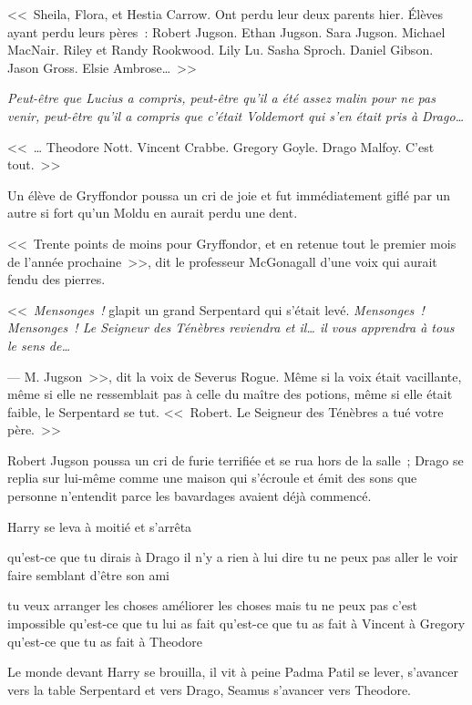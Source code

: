 <<~Sheila, Flora, et Hestia Carrow. Ont perdu leur deux parents hier. Élèves ayant perdu leurs pères~: Robert Jugson. Ethan Jugson. Sara Jugson. Michael MacNair. Riley et Randy Rookwood. Lily Lu. Sasha Sproch. Daniel Gibson. Jason Gross. Elsie Ambrose…~>>

\emph{Peut-être que Lucius a compris, peut-être qu'il a été assez malin pour ne pas venir, peut-être qu'il a compris que c'était Voldemort qui s'en était pris à Drago…}

<<~… Theodore Nott. Vincent Crabbe. Gregory Goyle. Drago Malfoy. C'est tout.~>>

Un élève de Gryffondor poussa un cri de joie et fut immédiatement giflé par un autre si fort qu'un Moldu en aurait perdu une dent.

<<~Trente points de moins pour Gryffondor, et en retenue tout le premier mois de l'année prochaine~>>, dit le professeur McGonagall d'une voix qui aurait fendu des pierres.

<<~\emph{Mensonges~!} glapit un grand Serpentard qui s'était levé. \emph{Mensonges~! Mensonges~! Le Seigneur des Ténèbres reviendra et il… il vous apprendra à tous le sens de…}

--- M. Jugson~>>, dit la voix de Severus Rogue. Même si la voix était vacillante, même si elle ne ressemblait pas à celle du maître des potions, même si elle était faible, le Serpentard se tut. <<~Robert. Le Seigneur des Ténèbres a tué votre père.~>>

Robert Jugson poussa un cri de furie terrifiée et se rua hors de la salle~; Drago se replia sur lui-même comme une maison qui s'écroule et émit des sons que personne n'entendit parce les bavardages avaient déjà commencé.

Harry se leva à moitié et s'arrêta

qu'est-ce que tu dirais à Drago il n'y a rien à lui dire tu ne peux pas aller le voir faire semblant d'être son ami

tu veux arranger les choses améliorer les choses mais tu ne peux pas c'est impossible qu'est-ce que tu lui as fait qu'est-ce que tu as fait à Vincent à Gregory qu'est-ce que tu as fait à Theodore

Le monde devant Harry se brouilla, il vit à peine Padma Patil se lever, s'avancer vers la table Serpentard et vers Drago, Seamus s'avancer vers Theodore.

